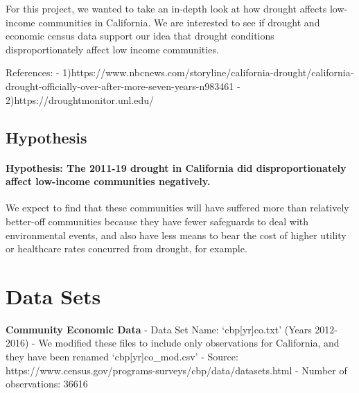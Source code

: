 \documentclass[11pt]{article}
\begin{document}
For this project, we wanted to take an in-depth look at how drought
affects low-income communities in California. We are interested to see
if drought and economic census data support our idea that drought
conditions disproportionately affect low income communities.

References: -
1)https://www.nbcnews.com/storyline/california-drought/california-drought-officially-over-after-more-seven-years-n983461
- 2)https://droughtmonitor.unl.edu/

    \hypertarget{hypothesis}{%
\subsection{Hypothesis}\label{hypothesis}}

    \hypertarget{hypothesis-the-2011-19-drought-in-california-did-disproportionately-affect-low-income-communities-negatively.}{%
\paragraph{Hypothesis: The 2011-19 drought in California did
disproportionately affect low-income communities
negatively.}\label{hypothesis-the-2011-19-drought-in-california-did-disproportionately-affect-low-income-communities-negatively.}}

We expect to find that these communities will have suffered more than
relatively better-off communities because they have fewer safeguards to
deal with environmental events, and also have less means to bear the
cost of higher utility or healthcare rates concurred from drought, for
example.

    \hypertarget{data-sets}{%
\section{Data Sets}\label{data-sets}}

    \textbf{Community Economic Data} - Data Set Name: `cbp{[}yr{]}co.txt'
(Years 2012-2016) - We modified these files to include only observations
for California, and they have been renamed `cbp{[}yr{]}co\_mod.csv' -
Source: https://www.census.gov/programs-surveys/cbp/data/datasets.html -
Number of observations: 36616
\end{document}
